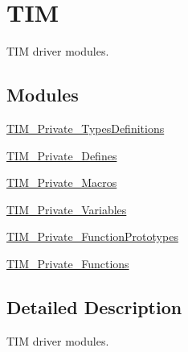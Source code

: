 \hypertarget{group___t_i_m}{\section{T\-I\-M}
\label{group___t_i_m}
}


T\-I\-M driver modules.  


\subsection*{Modules}
\begin{DoxyCompactItemize}
\item 
\hyperlink{group___t_i_m___private___types_definitions}{T\-I\-M\-\_\-\-Private\-\_\-\-Types\-Definitions}
\item 
\hyperlink{group___t_i_m___private___defines}{T\-I\-M\-\_\-\-Private\-\_\-\-Defines}
\item 
\hyperlink{group___t_i_m___private___macros}{T\-I\-M\-\_\-\-Private\-\_\-\-Macros}
\item 
\hyperlink{group___t_i_m___private___variables}{T\-I\-M\-\_\-\-Private\-\_\-\-Variables}
\item 
\hyperlink{group___t_i_m___private___function_prototypes}{T\-I\-M\-\_\-\-Private\-\_\-\-Function\-Prototypes}
\item 
\hyperlink{group___t_i_m___private___functions}{T\-I\-M\-\_\-\-Private\-\_\-\-Functions}
\end{DoxyCompactItemize}


\subsection{Detailed Description}
T\-I\-M driver modules. 